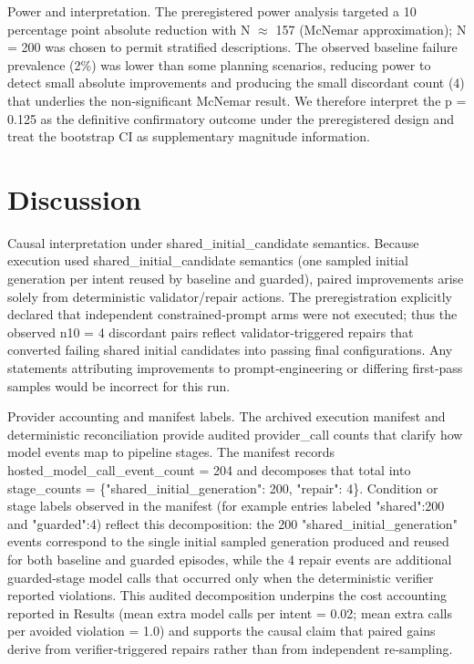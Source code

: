 \documentclass[conference]{IEEEtran}
\begin{document}
Power and interpretation. The preregistered power analysis targeted a 10 percentage point absolute reduction with N \ensuremath{\approx} 157 (McNemar approximation); N = 200 was chosen to permit stratified descriptions. The observed baseline failure prevalence (2\%) was lower than some planning scenarios, reducing power to detect small absolute improvements and producing the small discordant count (4) that underlies the non‑significant McNemar result. We therefore interpret the p = 0.125 as the definitive confirmatory outcome under the preregistered design and treat the bootstrap CI as supplementary magnitude information.

\section{Discussion}
Causal interpretation under shared\_initial\_candidate semantics. Because execution used shared\_initial\_candidate semantics (one sampled initial generation per intent reused by baseline and guarded), paired improvements arise solely from deterministic validator/repair actions. The preregistration explicitly declared that independent constrained‑prompt arms were not executed; thus the observed n10 = 4 discordant pairs reflect validator‑triggered repairs that converted failing shared initial candidates into passing final configurations. Any statements attributing improvements to prompt‑engineering or differing first‑pass samples would be incorrect for this run.

Provider accounting and manifest labels. The archived execution manifest and deterministic reconciliation provide audited provider\_call counts that clarify how model events map to pipeline stages. The manifest records hosted\_model\_call\_event\_count = 204 and decomposes that total into stage\_counts = \{"shared\_initial\_generation": 200, "repair": 4\}. Condition or stage labels observed in the manifest (for example entries labeled "shared":200 and "guarded":4) reflect this decomposition: the 200 "shared\_initial\_generation" events correspond to the single initial sampled generation produced and reused for both baseline and guarded episodes, while the 4 repair events are additional guarded‑stage model calls that occurred only when the deterministic verifier reported violations. This audited decomposition underpins the cost accounting reported in Results (mean extra model calls per intent = 0.02; mean extra calls per avoided violation = 1.0) and supports the causal claim that paired gains derive from verifier‑triggered repairs rather than from independent re‑sampling.
\end{document}
